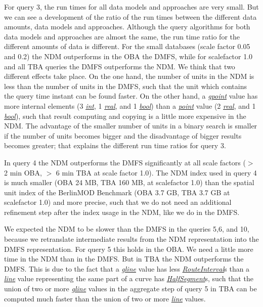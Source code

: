 \documentclass[a4paper]{article}
\newcommand{\bmodb} {BerlinMOD Benchmark}
\newcommand{\dt}[1]{\textsl{\underline{#1}}}
\begin{document}
For query 3, the run times for all data models and approaches are very small. But
we can see a development of the ratio of the run times between the different
data amounts, data models and approaches. Although the query algorithms for both
data models and approaches are almost the same, the run time ratio for the different
amounts of data is different. For the small databases (scale factor 0.05 and 0.2)
the NDM outperforms in the OBA the DMFS, while for scalefactor 1.0 and all TBA
queries the DMFS outperforms the NDM. We think that
two different effects take place. On the one hand, the number of units in the NDM
is less than the number of units in the DMFS,
such that the unit which contains the query time instant can be found faster.
On the other hand, a \dt{gpoint} value has more internal elements (3 \dt{int}, 1 \dt{real},
and 1 \dt{bool}) than a \dt{point} value (2 \dt{real}, and 1 \dt{bool}), such
that result computing and copying is a little more expensive in the NDM.
The advantage of the smaller number of units in a binary search is smaller if
the number of units becomes bigger and the disadvantage of bigger results becomes
greater; that explains the different run time ratios for query 3.

In query 4 the NDM outperforms the DMFS
significantly at all scale factors ($>$ 2 min OBA, $>$ 6 min TBA at scale factor 1.0).
The NDM index used in query 4 is much smaller (OBA 24 MB, TBA 160 MB, at scalefactor 1.0)
than the spatial unit index of the \bmodb{} (OBA 3.7 GB, TBA 3.7 GB at scalefactor 1.0)
and more precise, such that we do not need an additional refinement step after the
index usage in the NDM, like we do in the DMFS.

We expected the NDM to be slower than the DMFS in the queries 5,6, and 10, because
we retranslate intermediate results from the NDM representation into the DMFS representation.
For query 5 this holds in the OBA. We need a little more time in the NDM
than in the DMFS. But in TBA the NDM outperforms the DMFS. This is due to the fact
that a \dt{gline} value has less \dt{RouteInterval}s
than a \dt{line} value representing the same part of a curve has \dt{HalfSegment}s,
such that the union of two or more \dt{gline} values in the aggregate step of query 5 in
TBA can be computed much faster than the union of two or more \dt{line} values.
\end{document}
